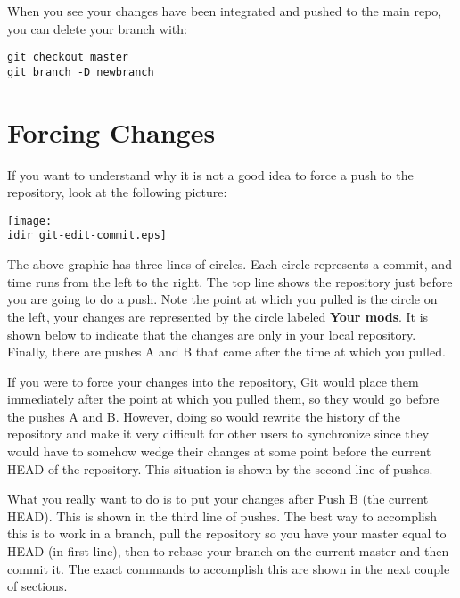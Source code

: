 When you see your changes have been integrated and pushed to the
main repo, you can delete your branch with:

\begin{verbatim}
git checkout master
git branch -D newbranch
\end{verbatim}


\section{Forcing Changes}
If you want to understand why it is not a good idea to force a 
push to the repository, look at the following picture:

\texttt{[image: \\idir git-edit-commit.eps]}

The above graphic has three lines of circles. Each circle represents
a commit, and time runs from the left to the right.  The top line
shows the repository just before you are going to do a push. Note the
point at which you pulled is the circle on the left, your changes are
represented by the circle labeled {\bf Your mods}. It is shown below
to indicate that the changes are only in your local repository.  Finally,
there are pushes A and B that came after the time at which you pulled.

If you were to force your changes into the repository, Git would place them
immediately after the point at which you pulled them, so they would
go before the pushes A and B.  However, doing so would rewrite the history
of the repository and make it very difficult for other users to synchronize
since they would have to somehow wedge their changes at some point before the
current HEAD of the repository.  This situation is shown by the second line of
pushes.

What you really want to do is to put your changes after Push B (the current HEAD).
This is shown in the third line of pushes.  The best way to accomplish this is to
work in a branch, pull the repository so you have your master equal to HEAD (in first
line), then to rebase your branch on the current master and then commit it.  The 
exact commands to accomplish this are shown in the next couple of sections.
